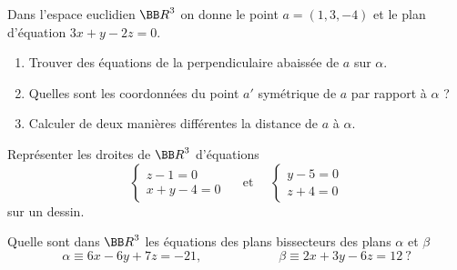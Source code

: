 \documentclass[12pt,french,oneside,a4paper]{memoir} %
\begin{document}
\begin{exo}
Dans l'espace euclidien ${\BB R}^3$ on donne le point $a=(1,3,-4)$ et le plan d'équation 
$3x+y-2z=0$.
\begin{enumerate}
\item Trouver des équations de la perpendiculaire abaissée de $a$ sur 
$\alpha$. 
\item Quelles sont les coordonnées du point $a'$ symétrique de $a$ 
par rapport à $\alpha$ ? 
\item Calculer de deux manières différentes la distance de $a$ à $\alpha$. 
\end{enumerate}
\end{exo}
\begin{exo}
Représenter les droites de ${\BB R}^3$ d'équations 
\begin{equation*}
\left\{ \begin{array}{l}
z-1=0 \\
x+y-4=0
\end{array} \right.
\quad \mbox{ et } \quad 
\left\{ \begin{array}{l}
y-5=0 \\
z+4=0
\end{array} \right.
\end{equation*}
sur un dessin.
\end{exo}
\begin{exo}
Quelle sont dans ${\BB R}^3$ les équations des plans bissecteurs des plans $\alpha$ et  
$\beta$
\begin{equation*}
\alpha \equiv 6x-6y+7z=-21, \qquad  \qquad \qquad \beta \equiv 2x+3y-6z=12 ~ ?
\end{equation*}
\end{exo}
\end{document}
